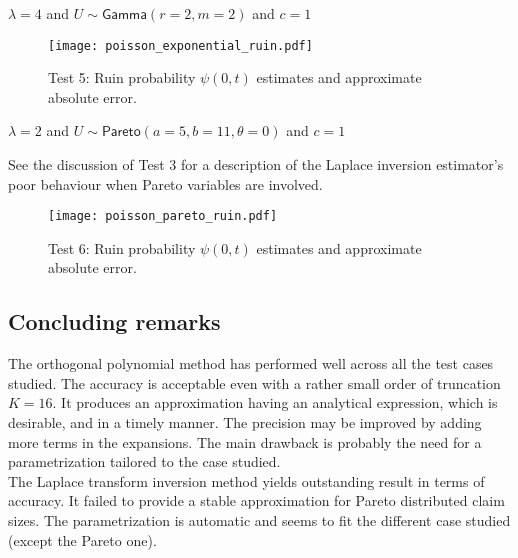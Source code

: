 \begin{test}
$\lambda=4$ and $U\sim\mathsf{Gamma}(r=2,m=2)$ and $c=1$
\end{test}


\begin{figure}[H]
\centering
\texttt{[image: poisson\_exponential\_ruin.pdf]}
\caption{Test 5: Ruin probability $\psi(0, t)$ estimates and approximate absolute error.}
\end{figure}





\begin{test} $\lambda=2$ and $U\sim\mathsf{Pareto}(a=5,b=11,\theta=0)$ and $c=1$
\end{test}

See the discussion of Test 3 for a description of the Laplace inversion estimator's poor behaviour when Pareto variables are involved. 

\begin{figure}[H]
\centering
\texttt{[image: poisson\_pareto\_ruin.pdf]}
\caption{Test 6: Ruin probability $\psi(0, t)$ estimates and approximate absolute error.}
\end{figure}
\subsection{Concluding remarks}
The orthogonal polynomial method has performed well across all the test cases studied. The accuracy is acceptable even with a rather small order of truncation $K=16$. It produces an approximation having an analytical expression, which is desirable, and in a timely manner. The precision may be improved by adding more terms in the expansions. The main drawback is probably the need for a parametrization tailored to the case studied.\\

The Laplace transform inversion method yields outstanding result in terms of accuracy. It failed to provide a stable approximation for Pareto distributed claim sizes. The parametrization is automatic and seems to fit the different case studied (except the Pareto one).\\

